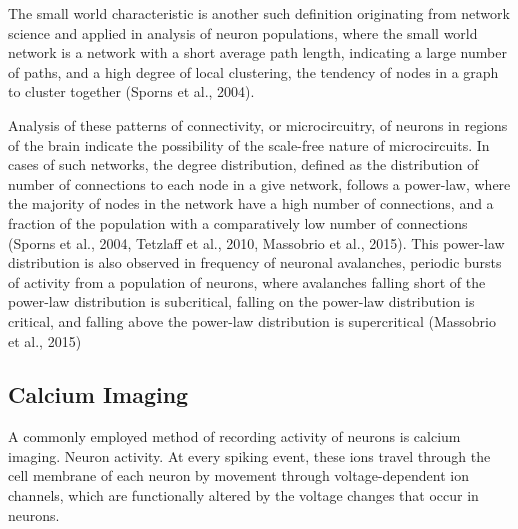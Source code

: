 \documentclass[11pt]{article}
\begin{document}
The small world characteristic is another such definition originating from network science and applied in analysis of neuron populations, where the small world network is a network with a short average path length, indicating a large number of paths, and a high degree of local clustering, the tendency of nodes in a graph to cluster together (Sporns et al., 2004).\par

Analysis of these patterns of connectivity, or microcircuitry, of neurons in regions of the brain indicate the possibility of the scale-free nature of microcircuits. In cases of such networks, the degree distribution, defined as the distribution of number of connections to each node in a give network, follows a power-law, where the majority of nodes in the network have a high number of connections, and a fraction of the population with a comparatively low number of connections (Sporns et al., 2004, Tetzlaff et al., 2010, Massobrio et al., 2015). This power-law distribution is also observed in frequency of neuronal avalanches, periodic bursts of activity from a population of neurons, where avalanches falling short of the power-law distribution is subcritical, falling on the power-law distribution is critical, and falling above the power-law distribution is supercritical (Massobrio et al., 2015)\par


\subsection{Calcium Imaging}
A commonly employed method of recording activity of neurons is calcium imaging. Neuron activity. At every spiking event, these ions travel through the cell membrane of each neuron by movement through voltage-dependent ion channels, which are functionally altered by the voltage changes that occur in neurons.\par
\end{document}
